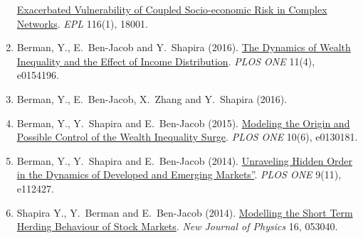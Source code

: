 \documentclass[10pt]{article}
\begin{document}
\begin{enumerate}
  \href{http://iopscience.iop.org/article/10.1209/0295-5075/116/18001/meta}{Exacerbated Vulnerability of Coupled Socio-economic Risk in Complex Networks}.
  \textit{EPL} 116(1), 18001.
\item Berman, Y., E.~Ben-Jacob and Y.~Shapira (2016).
  \href{http://journals.plos.org/plosone/article?id=10.1371/journal.pone.0154196}{The Dynamics of Wealth Inequality and the Effect of Income Distribution}.
  \textit{PLOS ONE} 11(4), e0154196.
\item Berman, Y., E.~Ben-Jacob, X.~Zhang and Y.~Shapira (2016).
\item Berman, Y., Y.~Shapira and E.~Ben-Jacob (2015).
  \href{http://journals.plos.org/plosone/article?id=10.1371/journal.pone.0130181}{Modeling the Origin and Possible Control of the Wealth Inequality Surge}.
  \textit{PLOS ONE} 10(6), e0130181.
\item Berman, Y., Y.~Shapira and E.~Ben-Jacob (2014).
  \href{http://journals.plos.org/plosone/article?id=10.1371/journal.pone.0112427}{Unraveling Hidden Order in the Dynamics of Developed and Emerging Markets''}.
  \textit{PLOS ONE} 9(11), e112427.
\item Shapira Y., Y.~Berman and E.~Ben-Jacob (2014).
  \href{http://iopscience.iop.org/1367-2630/16/5/053040/article}{Modelling the Short Term Herding Behaviour of Stock Markets}.
  \textit{New Journal of Physics} 16, 053040.
\end{enumerate}

%
%
\end{document}
